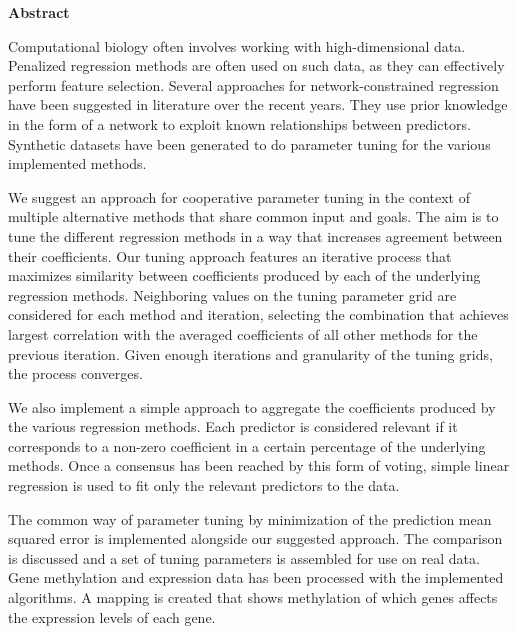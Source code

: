 \newpage
{\Huge \bf Abstract}
\vspace{24pt} 

Computational biology often involves working with high-dimensional data. Penalized regression methods are often used on such data, as they can effectively perform feature selection. Several approaches for network-constrained regression have been suggested in literature over the recent years. They use prior knowledge in the form of a network to exploit known relationships between predictors. Synthetic datasets have been generated to do parameter tuning for the various implemented methods. 

We suggest an approach for cooperative parameter tuning in the context of multiple alternative methods that share common input and goals. The aim is to tune the different regression methods in a way that increases agreement between their coefficients. Our tuning approach features an iterative process that maximizes similarity between coefficients produced by each of the underlying regression methods. Neighboring values on the tuning parameter grid are considered for each method and iteration, selecting the combination that achieves largest correlation with the averaged coefficients of all other methods for the previous iteration. Given enough iterations and granularity of the tuning grids, the process converges.

We also implement a simple approach to aggregate the coefficients produced by the various regression methods. Each predictor is considered relevant if it corresponds to a non-zero coefficient in a certain percentage of the underlying methods. Once a consensus has been reached by this form of voting, simple linear regression is used to fit only the relevant predictors to the data.

The common way of parameter tuning by minimization of the prediction mean squared error is implemented alongside our suggested approach. The comparison is discussed and a set of tuning parameters is assembled for use on real data. Gene methylation and expression data has been processed with the implemented algorithms. A mapping is created that shows methylation of which genes affects the expression levels of each gene.

\newpage
\vspace*{\fill}
